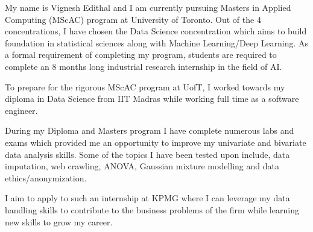 \documentclass{resume}
\begin{document}
My name is Vignesh Edithal and I am currently pursuing Masters in Applied Computing (MScAC) program at University of Toronto.
Out of the 4 concentrations, I have chosen the Data Science concentration which aims to build foundation
in statistical sciences along with Machine Learning/Deep Learning. As a formal requirement of completing my program,
students are required to complete an 8 months long industrial research internship in the field of AI.

To prepare for the rigorous MScAC program at UofT, I worked towards my diploma in Data Science from IIT Madras while working full time as a software engineer.

During my Diploma and Masters program I have complete numerous labs and exams which provided me an opportunity to improve my univariate and bivariate data analysis skills. Some of the topics I have been tested upon include, data imputation, web crawling, ANOVA, Gaussian mixture modelling and data ethics/anonymization.

I aim to apply to such an internship at KPMG where I can leverage my data handling skills to contribute to the business problems of the firm while learning new skills to grow my career.
\end{document}
